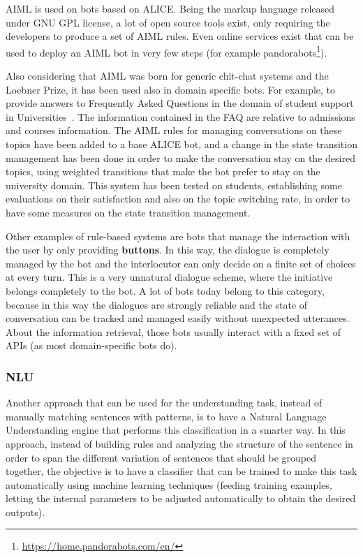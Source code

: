 AIML is used on bots based on ALICE. Being the markup language released under GNU GPL license, a lot of open source tools exist, only requiring the developers to produce a set of AIML rules. Even online services exist that can be used to deploy an AIML bot in very few steps (for example pandorabots\footnote{\url{https://home.pandorabots.com/en/}}).

Also considering that AIML was born for generic chit-chat systems and the Loebner Prize, it has been used also in domain specific bots. For example, to provide answers to Frequently Asked Questions in the domain of student support in Universities~\cite{ghose2013toward}. The information contained in the FAQ are relative to admissions and courses information. The AIML rules for managing conversations on these topics have been added to a base ALICE bot, and a change in the state transition management has been done in order to make the conversation stay on the desired topics, using weighted transitions that make the bot prefer to stay on the university domain. This system has been tested on students, establishing some evaluations on their satisfaction and also on the topic switching rate, in order to have some measures on the state transition management.

Other examples of rule-based systems are bots that manage the interaction with the user by only providing \textbf{buttons}. In this way, the dialogue is completely managed by the bot and the interlocutor can only decide on a finite set of choices at every turn. This is a very unnatural dialogue scheme, where the initiative belongs completely to the bot. A lot of bots today belong to this category, because in this way the dialogues are strongly reliable and the state of conversation can be tracked and managed easily without unexpected utterances. About the information retrieval, those bots usually interact with a fixed set of APIs (as most domain-specific bots do).

\subsubsection{NLU}
\label{soaNLUIntro}

Another approach that can be used for the understanding task, instead of manually matching sentences with patterns, is to have a Natural Language Understanding engine that performs this classification in a smarter way. In this approach, instead of building rules and analyzing the structure of the sentence in order to span the different variation of sentences that should be grouped together, the objective is to have a classifier that can be trained to make this task automatically using machine learning techniques (feeding training examples, letting the internal parameters to be adjusted automatically to obtain the desired outputs).

